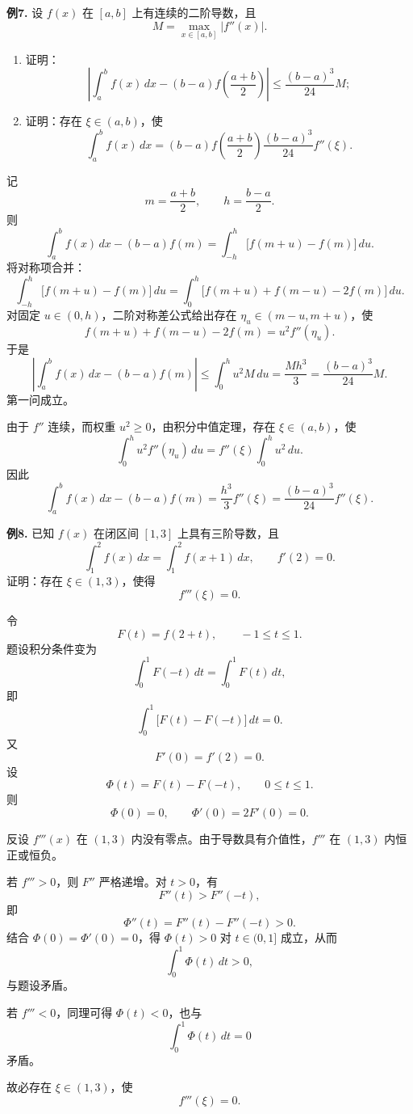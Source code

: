 \begin{problemblock}
\textbf{例7.} 设 \(f(x)\) 在 \([a,b]\) 上有连续的二阶导数，且
\[
M=\max_{x\in[a,b]}|f''(x)|.
\]
\begin{enumerate}[label=(\arabic*), leftmargin=2.2em]
\item 证明：
\[
\left|\int_a^b f(x)\,dx-(b-a)f\left(\frac{a+b}{2}\right)\right|
\le \frac{(b-a)^3}{24}M;
\]
\item 证明：存在 \(\xi\in(a,b)\)，使
\[
\int_a^b f(x)\,dx
=(b-a)f\left(\frac{a+b}{2}\right)
\frac{(b-a)^3}{24}f''(\xi).
\]
\end{enumerate}
\end{problemblock}
\begin{solutionblock}
记
\[
m=\frac{a+b}{2},\qquad h=\frac{b-a}{2}.
\]
则
\[
\int_a^b f(x)\,dx-(b-a)f(m)
=\int_{-h}^{h}\bigl[f(m+u)-f(m)\bigr]\,du.
\]
将对称项合并：
\[
\int_{-h}^{h}\bigl[f(m+u)-f(m)\bigr]\,du
=\int_0^h\bigl[f(m+u)+f(m-u)-2f(m)\bigr]\,du.
\]
对固定 \(u\in(0,h)\)，二阶对称差公式给出存在 \(\eta_u\in(m-u,m+u)\)，使
\[
f(m+u)+f(m-u)-2f(m)=u^2 f''(\eta_u).
\]
于是
\[
\left|\int_a^b f(x)\,dx-(b-a)f(m)\right|
\le \int_0^h u^2 M\,du
=\frac{Mh^3}{3}
=\frac{(b-a)^3}{24}M.
\]
第一问成立。

由于 \(f''\) 连续，而权重 \(u^2\ge0\)，由积分中值定理，存在 \(\xi\in(a,b)\)，使
\[
\int_0^h u^2 f''(\eta_u)\,du
=f''(\xi)\int_0^h u^2\,du.
\]
因此
\[
\int_a^b f(x)\,dx-(b-a)f(m)
=\frac{h^3}{3}f''(\xi)
=\frac{(b-a)^3}{24}f''(\xi).
\]
\end{solutionblock}

\begin{problemblock}
\textbf{例8.} 已知 \(f(x)\) 在闭区间 \([1,3]\) 上具有三阶导数，且
\[
\int_1^2 f(x)\,dx=\int_1^2 f(x+1)\,dx,\qquad f'(2)=0.
\]
证明：存在 \(\xi\in(1,3)\)，使得
\[
f'''(\xi)=0.
\]
\end{problemblock}
\begin{solutionblock}
令
\[
F(t)=f(2+t),\qquad -1\le t\le1.
\]
题设积分条件变为
\[
\int_0^1 F(-t)\,dt=\int_0^1 F(t)\,dt,
\]
即
\[
\int_0^1\bigl[F(t)-F(-t)\bigr]\,dt=0.
\]
又
\[
F'(0)=f'(2)=0.
\]
设
\[
\Phi(t)=F(t)-F(-t),\qquad 0\le t\le1.
\]
则
\[
\Phi(0)=0,\qquad \Phi'(0)=2F'(0)=0.
\]

反设 \(f'''(x)\) 在 \((1,3)\) 内没有零点。由于导数具有介值性，\(f'''\) 在 \((1,3)\) 内恒正或恒负。

若 \(f'''>0\)，则 \(F''\) 严格递增。对 \(t>0\)，有
\[
F''(t)>F''(-t),
\]
即
\[
\Phi''(t)=F''(t)-F''(-t)>0.
\]
结合 \(\Phi(0)=\Phi'(0)=0\)，得 \(\Phi(t)>0\) 对 \(t\in(0,1]\) 成立，从而
\[
\int_0^1\Phi(t)\,dt>0,
\]
与题设矛盾。

若 \(f'''<0\)，同理可得 \(\Phi(t)<0\)，也与
\[
\int_0^1\Phi(t)\,dt=0
\]
矛盾。

故必存在 \(\xi\in(1,3)\)，使
\[
f'''(\xi)=0.
\]
\end{solutionblock}

